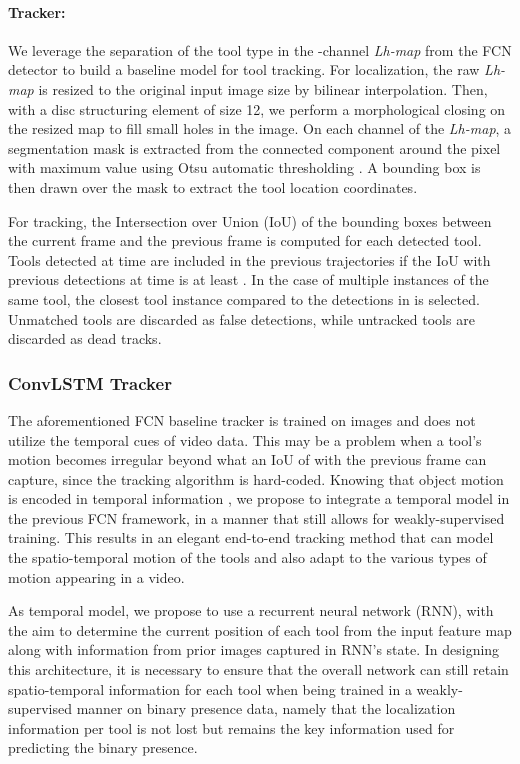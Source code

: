\documentclass{svjour3}                     \smartqed
\newcommand{\bd}[1]{\textbf{#1}}
\begin{document}
\paragraph{\bd{Tracker: }}
We leverage the separation of the tool type in the -channel \emph{Lh-map} from the FCN detector to build a baseline model for tool tracking.
For localization, the raw \emph{Lh-map} is resized to the original input image size by bilinear interpolation. 
Then, with a disc structuring element of size 12, we perform a morphological closing on the resized map to fill small holes in the image.
On each channel of the \emph{Lh-map}, a segmentation mask is extracted from the connected component around the pixel with maximum value using Otsu automatic thresholding \cite{smc:otsu1979threshold}. A bounding box is then drawn over the mask to extract the tool location coordinates.

For tracking, the Intersection over Union (IoU) of the bounding boxes between the current frame  and the previous frame  is computed for each detected tool. Tools detected at time  are included in the previous trajectories if the IoU with previous detections at time  is at least .
In the case of multiple instances of the same tool, the closest tool instance compared to the detections in  is selected.
Unmatched tools are discarded as false detections, while untracked tools are discarded as dead tracks.



\subsubsection{ConvLSTM Tracker}\label{sec:convlstm_tracker}
The aforementioned FCN baseline tracker is trained on images and does not utilize the temporal cues of video data.
This may be a problem when a tool's motion becomes irregular beyond what an IoU of  with the previous frame can capture, since the tracking algorithm is hard-coded. 
Knowing that object motion is encoded in temporal information \cite{cvpr:luo2018fast,arXiv:liu2017mobile}, we propose to integrate a temporal model in the previous FCN framework, in a manner that still allows for weakly-supervised training. This results in an elegant end-to-end tracking method that can model the spatio-temporal motion of the tools and also adapt to the various types of motion appearing in a video. 

As temporal model, we propose to use a recurrent neural network (RNN), with the aim to determine the current position of each tool from the input feature map along with information from prior images captured in RNN's state. In designing this architecture, it is necessary to ensure that the overall network can still retain spatio-temporal information for each tool when being trained in a weakly-supervised manner on binary presence data, namely that the localization information per tool is not lost but remains the key information used for predicting the binary presence.
\end{document}
